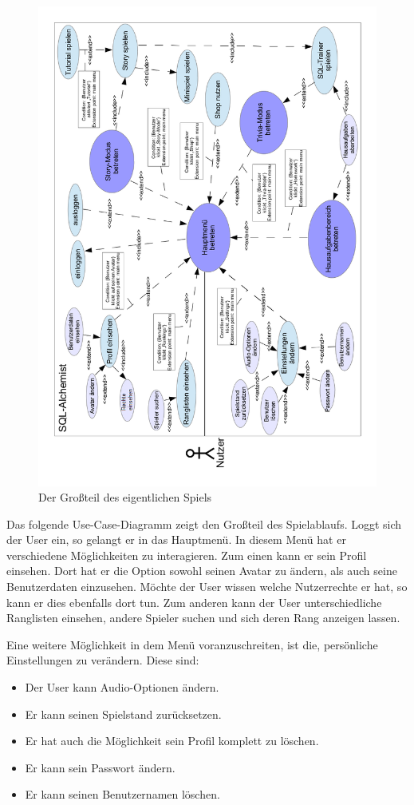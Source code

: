 \begin{figure}[ht]
\centering
\includegraphics[width=1\textwidth]{figures/UseCaseDiagrammFinal.PNG}
\caption{Der Großteil des eigentlichen Spiels}
\end{figure}
Das folgende Use-Case-Diagramm  zeigt den Gro{\ss}teil des Spielablaufs. Loggt sich der User ein, so gelangt er in das Hauptmen\"u. In diesem Men\"u 
hat er verschiedene M\"oglichkeiten zu interagieren. Zum einen kann er sein Profil einsehen. Dort hat er die Option sowohl seinen Avatar zu \"andern, als auch seine 
Benutzerdaten einzusehen. M\"ochte der User wissen welche Nutzerrechte er hat, so kann er dies ebenfalls dort tun.
Zum anderen kann der User unterschiedliche Ranglisten einsehen, andere Spieler suchen und sich deren Rang anzeigen lassen.

Eine weitere M\"oglichkeit in dem Men\"u voranzuschreiten, ist die, pers\"onliche Einstellungen zu ver\"andern. Diese sind: 
\begin{itemize}
	\item Der User kann Audio-Optionen \"andern.
	\item Er kann seinen Spielstand zur\"ucksetzen.
	\item Er hat auch die M\"oglichkeit sein Profil komplett zu l\"oschen.
	\item Er kann sein Passwort \"andern.
	\item Er kann seinen Benutzernamen l\"oschen.
\end{itemize}

